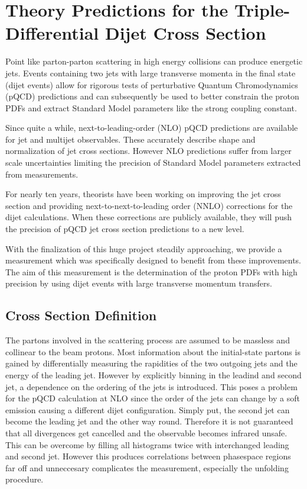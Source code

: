
\chapter{Theory Predictions for the Triple-Differential Dijet Cross Section}

Point like parton-parton scattering in high energy collisions can produce
energetic jets. Events containing two jets with large transverse momenta  in the
final state (dijet events) allow for rigorous tests of perturbative Quantum
Chromodynamics (pQCD) predictions and can subsequently be used to better
constrain the proton PDFs and extract Standard Model parameters like the strong
coupling constant.

Since quite a while, next-to-leading-order (NLO) pQCD predictions are available
for jet and multijet observables. These accurately describe shape and
normalization of jet cross sections. However NLO predictions suffer from larger scale
uncertainties limiting the precision of Standard Model parameters extracted from
measurements.

For nearly ten years, theorists have been working on improving the jet cross
section and providing next-to-next-to-leading order (NNLO) corrections for the
dijet calculations. When these corrections are publicly available, they will
push the precision of pQCD jet cross section predictions to a new level.

With the finalization of this huge project steadily approaching, we provide a
measurement which was specifically designed to benefit from these improvements.
The aim of this measurement is the determination of the proton PDFs with high
precision by using dijet events with large transverse momentum transfers.

\section{Cross Section Definition}

The partons involved in the scattering process are assumed to be massless and
collinear to the beam protons. Most information about the initial-state partons
is gained by differentially measuring the rapidities of the two outgoing jets
and the energy of \eg the leading jet. However by explicitly binning in the
leadind and second jet, a dependence on the ordering of the jets is introduced.
This poses a problem for the pQCD calculation at NLO since the order of the jets
can change by a soft emission causing a different dijet configuration. Simply
put, the second jet can become the leading jet and the other way round. Therefore
it is not guaranteed that all divergences get cancelled and the observable
becomes infrared unsafe. This can be overcome by filling all histograms twice
with interchanged leading and second jet. However this produces correlations
between phasespace regions far off and unneccesary complicates the measurement,
especially the unfolding procedure.

